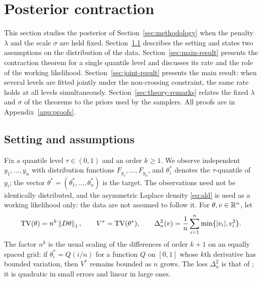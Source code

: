 \providecommand{\TV}{\mathrm{TV}}
\providecommand{\lamtv}{\lambda_{\TV}}
\providecommand{\thetas}{\theta^{*}}
\providecommand{\fl}{\underline f}
\providecommand{\fu}{\bar f}
\providecommand{\Vb}{\bar V}
\renewcommand{\theassumption}{\Alph{assumption}}

\section{Posterior contraction}\label{sec:theory}

This section studies the posterior of Section~\ref{sec:methodology} when the penalty $\lambda$ and the scale $\sigma$ are held fixed. Section~\ref{sec:assumptions} describes the setting and states two assumptions on the distribution of the data. Section~\ref{sec:main-result} presents the contraction theorem for a single quantile level and discusses its rate and the role of the working likelihood. Section~\ref{sec:joint-result} presents the main result: when several levels are fitted jointly under the non-crossing constraint, the same rate holds at all levels simultaneously. Section~\ref{sec:theory-remarks} relates the fixed $\lambda$ and $\sigma$ of the theorems to the priors used by the samplers. All proofs are in Appendix~\ref{app:proofs}.

\subsection{Setting and assumptions}\label{sec:assumptions}

Fix a quantile level $\tau\in(0,1)$ and an order $k\ge1$. We observe independent $y_1,\dots,y_n$ with distribution functions $F_{y_1},\dots,F_{y_n}$, and $\thetas_i$ denotes the $\tau$-quantile of $y_i$; the vector $\thetas=(\thetas_1,\dots,\thetas_n)$ is the target. The observations need not be identically distributed, and the asymmetric Laplace density \eqref{eq:ald} is used as a working likelihood only: the data are not assumed to follow it. For $\theta,v\in\mathbb{R}^n$, let
\[
\TV(\theta)=n^{k}\norm{D\theta}_1,\qquad V^{*}=\TV(\thetas),\qquad
\Delta_n^2(v)=\frac1n\sum_{i=1}^n\min\{|v_i|,v_i^2\}.
\]
The factor $n^k$ is the usual scaling of the differences of order $k+1$ on an equally spaced grid: if $\thetas_i=Q(i/n)$ for a function $Q$ on $[0,1]$ whose $k$th derivative has bounded variation, then $V^{*}$ remains bounded as $n$ grows. The loss $\Delta_n^2$ is that of \citet{madrid2022risk}; it is quadratic in small errors and linear in large ones.

